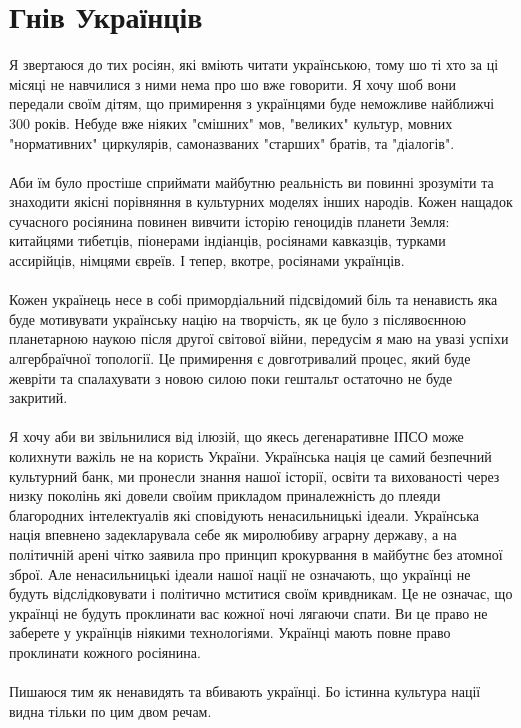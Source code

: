 \section{Гнів Українців}

Я звертаюся до тих росіян, які вміють читати українською, тому шо ті хто за ці місяці не навчилися з ними нема про шо вже говорити. Я хочу шоб вони передали своїм дітям, що примирення з українцями буде неможливе найближчі 300 років. Небуде вже ніяких "смішних" мов, "великих" культур, мовних "нормативних" циркулярів, самоназваних "старших" братів, та "діалогів".
\\
\\
Аби їм було простіше сприймати майбутню реальність ви повинні зрозуміти та знаходити якісні порівняння в культурних моделях інших народів. Кожен нащадок сучасного росіянина повинен вивчити історію геноцидів планети Земля: китайцями тибетців, піонерами індіанців, росіянами кавказців, турками ассирійців, німцями євреїв. І тепер, вкотре, росіянами українців.
\\
\\
Кожен українець несе в собі примордіальний підсвідомий біль та ненависть яка буде мотивувати українську націю на творчість, як це було з післявоєнною планетарною наукою після другої світової війни, передусім я маю на увазі успіхи алгербраїчної топології. Це примирення є довготривалий процес, який буде жевріти та спалахувати з новою силою поки гештальт остаточно не буде закритий.
\\
\\
Я хочу аби ви звільнилися від ілюзій, що якесь дегенаративне ІПСО може колихнути важіль не на користь України. Українська нація це самий безпечний культурний банк, ми пронесли знання нашої історії, освіти та вихованості через низку поколінь які довели своїим прикладом приналежність до плеяди благородних інтелектуалів які сповідують ненасильницькі ідеали. Українська нація впевнено задекларувала себе як миролюбиву аграрну державу, а на політичній арені чітко заявила про принцип крокурвання в майбутнє без атомної зброї. Але ненасильницькі ідеали нашої нації не означають, що українці не будуть відслідковувати і політично мститися своїм кривдникам. Це не означає, що українці не будуть проклинати вас кожної ночі лягаючи спати. Ви це право не заберете у українців ніякими технологіями. Українці мають повне право проклинати кожного росіянина.
\\
\\
Пишаюся тим як ненавидять та вбивають українці. Бо істинна культура нації видна тільки по цим двом речам.

\normalsize
